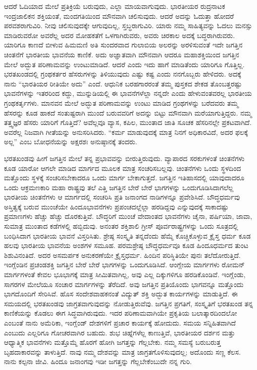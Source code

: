 ಆದರೆ ಓದಿಯಾದ ಮೇಲೆ ಪ್ರತಿಕ್ರಿಯೆ ಬರುವುದು, ಎಲ್ಲಾ ಮಾಯವಾಗುವುದು. ಭಾರತೀಯರ ರುದ್ರನಾಟಕ ಇಂದ್ರಜಾಲಿಕನ ಶಕ್ತಿಯಂತೆ, ಮಂದಗತಿಯಿಂದ ಮೌನ\break ವಾಗಿ ಚಲಿಸುವುದು. ಆದರೆ ಅದನ್ನು ಓದುತ್ತಾ ಹೋದರೆ ಪರವಶರಾಗುವಿರಿ. ನೀವು ಚಲಿಸುವುದಕ್ಕೇ ಆಗುವುದಿಲ್ಲ, ಸ್ತಬ್ಧರಾಗುವಿರಿ. ಯಾರು ನಮ್ಮ ಸಾಹಿತ್ಯವನ್ನು ಓದಲು ಮನಸ್ಸು ಮಾಡಿರುವರೋ ಅವರೆಲ್ಲ ಅದರ ಮೋಹಕತೆಗೆ ಒಳಗಾಗಿರುವರು, ಅವರು ಚಿರಕಾಲ ಅದಕ್ಕೆ ಬದ್ಧರಾಗಿರುವರು. ಯಾರಿಗೂ ಕಾಣದೆ ಬೀಳುವ ಹಿಮಮಣಿ ಅತಿ ಸುಂದರವಾದ ಗುಲಾಬಿಯ ಅಲರನ್ನು ಅರಳಿಸುವಂತೆ ಇದೇ ಜಗತ್ತಿನ ಚಿಂತನೆಗೆ ಭಾರತೀಯ ಭಾವನೆಯ ಕಾಣಿಕೆ. ಅದು ಅಜ್ಞಾತವಾಗಿ ಮೌನವಾಗಿ ಆದರೂ ಮಹಾಶಕ್ತಿಯಿಂದ ಜಗತ್ತಿನ ಮೇಲೆ ಅದ್ಭುತ ಪರಿಣಾಮವನ್ನು ಉಂಟುಮಾಡಿದೆ. ಆದರೆ ಎಂದು ಇದು ಹಾಗೆ ಮಾಡಿತೆಂದು ಯಾರಿಗೂ ಗೊತ್ತಿಲ್ಲ. ಭರತಖಂಡದಲ್ಲಿ ಗ್ರಂಥಕರ್ತರ ಹೆಸರುಗಳನ್ನು ತಿಳಿಯುವುದು ಎಷ್ಟು ಕಷ್ಟ ಎಂದು ನನಗೊಬ್ಬರು ಹೇಳಿದರು. ಅದಕ್ಕೆ ನಾನು “ಭಾರತಿಯರ ರೀತಿಯೇ ಅದು” ಎಂದೆ. ಆಧುನಿಕ ಬರಹಗಾರರಂತೆ ತಮ್ಮ ಪುಸ್ತಕದ ಶೇಕಡ ತೊಂಬತ್ತರಷ್ಟು ಭಾವನೆಗಳನ್ನು ಇತರರಿಂದ ಕದ್ದು, ಮುನ್ನುಡಿಯಲ್ಲಿ ಈ ಭಾವನೆಗಳೆಲ್ಲಾ ನನ್ನದೇ ಎಂದು ಹೇಳುವಂತವರಲ್ಲ ಭಾರತೀಯ ಗ್ರಂಥಕರ್ತೃಗಳು. ಮಾನವನ ಮೇಲೆ ಅದ್ಭುತ ಪರಿಣಾಮವನ್ನು ಉಂಟು ಮಾಡಿದ ಗ್ರಂಥಗಳನ್ನು ಬರೆದವರು ತಮ್ಮ ಹೆಸರನ್ನು ಕೂಡ ಹಾಕದೆ ಸಂತುಷ್ಟರಾಗಿ ಮುಂದೆ ಬರುವವರಿಗೆ ಅದನ್ನು ಬಿಟ್ಟು ಮೌನವಾಗಿ ಮರೆಯಾಗುತ್ತಿದ್ದರು. ನಮ್ಮ ತತ್ತ್ವಜ್ಞರ ಹೆಸರು ಯಾರಿಗೆ ಗೊತ್ತಿದೆ? ಅವೆಲ್ಲವೂ ವ್ಯಾಸ, ಕಪಿಲ, ಮುಂತಾದ ಜಾತಿ ಸೂಚಕ ಹೆಸರಿನಲ್ಲೇ ಪ್ರಕಟವಾಗಿದೆ. ಅವರೆಲ್ಲ ನಿಜವಾಗಿ ಗೀತೆಯನ್ನು ಅನುಸರಿಸಿದರು. “ಕರ್ಮ ಮಾಡುವುದಕ್ಕೆ ಮಾತ್ರ ನಿನಗೆ ಅಧಿಕಾರವಿದೆ, ಅದರ ಫಲಕ್ಕೆ ಅಲ್ಲ” ಎಂಬ ಬೋಧನೆಯನ್ನು ಅಕ್ಷರಶಃ ಅನುಷ್ಠಾನಕ್ಕೆ ತಂದರು.

\vskip   4pt

ಭರತಖಂಡವು ಹೀಗೆ ಜಗತ್ತಿನ ಮೇಲೆ ತನ್ನ ಪ್ರಭಾವವನ್ನು ಬೀರುತ್ತಿರುವುದು. ವ್ಯಾಪಾರದ ಸರಕುಗಳಂತೆ ಚಿಂತನೆಗಳು ಕೂಡ ಯಾರೋ ಆಗಲೇ ಮಾಡಿದ ಮಾರ್ಗದ ಮೂಲಕ ಮಾತ್ರ ಸಂಚರಿಸಬಲ್ಲವು. ಚಿಂತನೆಗಳು ಒಂದು ಸ್ಥಳದಿಂದ ಮತ್ತೊಂದು ಸ್ಥಳಕ್ಕೆ ಸಂಚರಿಸಬೇಕಾದರೂ ಒಂದು ಮಾರ್ಗ ಬೇಕಾಗುತ್ತದೆ. ಜಗತ್ತಿನ ಇತಿಹಾಸದಲ್ಲಿ ಯಾವು\-ದಾದರೂ ಒಂದು ಆಕ್ರಮಣಕಾರಿ ಮಹಾ ರಾಷ್ಟ್ರವು ತಲೆ ಎತ್ತಿ ಜಗತ್ತಿನ ಬೇರೆ ಬೇರೆ ಭಾಗಗಳನ್ನು ಒಂದುಗೂಡಿಸಿದಾಗಲೆಲ್ಲ ಭಾರತೀಯ ಚಿಂತನೆಗಳು ಆ ಮಾರ್ಗದಲ್ಲಿ ಸಂಚರಿಸಿ ಪ್ರತಿ ಜನಾಂಗದ ನಾಡಿಗಳನ್ನೂ ಪ್ರವೇಶಿಸಿದೆ. ಬೌದ್ಧಧರ್ಮವು ಅಸ್ತಿತ್ವಕ್ಕೆ ಬರುವ ಮುಂಚೆಯೇ ಹಿಂದೂಭಾವನೆಗಳು ಪ್ರಪಂಚದಲ್ಲೆಲ್ಲಾ ಹರಡಿದ್ದವು ಎನ್ನುವುದಕ್ಕೆ ಸಾಕಾದಷ್ಟು ಪ್ರಮಾಣಗಳು ಹೆಚ್ಚು ಹೆಚ್ಚು ದೊರಕುತ್ತಿವೆ. ಬೌದ್ಧರಿಗೆ ಮುಂಚೆ ವೇದಾಂತದ ಭಾವನೆಗಳು ಚೈನಾ, ಪರ್ಷಿಯಾ, ಜಾವಾ, ಸುಮಾತ್ರ ಮುಂತಾದ ಕಡೆಗಳಲ್ಲಿ ಹಬ್ಬಿದುವು. ಅನಂತರ ಶಕ್ತಿಶಾಲಿ ಗ್ರೀಸ್​ ಪೂರ್ವರಾಷ್ಟ್ರಗಳನ್ನು ಒಂದು ಸೂತ್ರದಲ್ಲಿ ಬಂಧಿಸಿದಾಗ ಭಾರತೀಯ ಭಾವನೆ ವಿಸ್ತರಿಸಿತು. ಶ್ರೇಷ್ಠ ಸಂಸ್ಕೃತಿ ತನ್ನದೆಂದು ಹೆಮ್ಮೆ ಕೊಚ್ಚಿಕೊಳ್ಳುವ ಕ್ರೈಸ್ತ ಧರ್ಮ ಕೂಡ ಹಲವು ಭಾರತೀಯ ಭಾವನೆಯ ಅಂಶಗಳ ಸಮೂಹ. ಪರಮಶ್ರೇಷ್ಠ ಬೌದ್ಧಧರ್ಮವೂ ಕೂಡ ಹಿಂದೂಧರ್ಮದ ತುಂಟ ಶಿಶುವಿನಂತಿದೆ. ಅದರ ಅಸಮರ್ಪಕ ಅನುಕರಣೆಯೇ ಕ್ರೈಸ್ತಧರ್ಮ. ಹಿಂದಿನ ಪರಿಸ್ಥಿತಿಯೇ ಪುನಃ ತಲೆದೋರುತ್ತಿದೆ. ಇಂಗ್ಲೆಂಡಿನ ಪ್ರಚಂಡಶಕ್ತಿ ಜಗತ್ತಿನ ಬೇರೆ ಬೇರೆ ಭಾಗಗಳನ್ನು ಒಂದುಗೂಡಿಸಿದೆ. ಆಂಗ್ಲೇಯ ಮಾರ್ಗಗಳು ರೋಮನ್​ ಮಾರ್ಗಗಳಂತೆ ಕೇವಲ ಭೂಭಾಗಕ್ಕೆ ಮಾತ್ರ ಸೀಮಿತವಾಗಿಲ್ಲ, ಅವು ಎಲ್ಲ ದಿಕ್ಕುಗಳಿಗೂ ಹರಡಿಕೊಂಡಿವೆ. ಇಂಗ್ಲೆಂಡು, ಸಾಗರಗಳ ಮೇಲೆಯೂ ಸಂಚಾರ ಮಾರ್ಗಗಳನ್ನು ತೆರೆದಿದೆ. ಅವು ಜಗತ್ತಿನ ಪ್ರತಿಯೊಂದು ಭಾಗವನ್ನೂ ಮತ್ತೊಂದು ಭಾಗದೊಂದಿಗೆ ಸೇರಿಸಿವೆ. ಹೊಸ ಸಂದೇಶವಾಹಕನಂತೆ ವಿದ್ಯುತ್​ ಶಕ್ತಿ ಅದ್ಭುತ ಕಾರ್ಯಗಳನ್ನು ಮಾಡುತ್ತಿದೆ. ಈ ಸಮಯದಲ್ಲಿ ಭರತಖಂಡವು ಜಾಗ್ರತವಾಗುವುದನ್ನು ನೋಡುತ್ತಿರುವೆವು. ಜಗತ್ತಿನ ಪ್ರಗತಿಗೆ, ಸಂಸ್ಕೃತಿಗೆ ಭರತಖಂಡ ತನ್ನ ಕಾಣಿಕೆಯನ್ನು ಕೊಡಲು ಈಗ ಸಿದ್ಧವಾಗಿರುವುದು. ಇದರ ಪರಿಣಾಮವಾಗಿಯೇ ಪ್ರಕೃತಿಯ ಬಲಾತ್ಕಾರದಿಂದಲೋ ಎಂಬಂತೆ ನಾನು ಅಮೆರಿಕಾ, ಇಂಗ್ಲೆಂಡ್​ ದೇಶಗಳಿಗೆ ಪ್ರಚಾರ ಕಾರ್ಯಕ್ಕೆ ಹೋದುದು. ಸಮಯ ಸನ್ನಿಹಿತ\-ವಾಗಿದೆ ಎಂಬುದು ಎಲ್ಲರಿಗೂ ಗೋಚರವಾಗಿರ ಬಹುದು. ಶುಭ ಚಿಹ್ನೆಗಳೆಲ್ಲ ಕಾಣುತ್ತಿವೆ, ಭಾರತೀಯರ ದರ್ಶನ ಮತ್ತು ಆಧ್ಯಾತ್ಮಿಕ ಭಾವನೆಗಳು ಮತ್ತೊಮ್ಮೆ ಹೊರಗೆ ಹೋಗಿ ಜಗತ್ತನ್ನು ಗೆಲ್ಲಬೇಕು. ನಮ್ಮ ಸಮಸ್ಯೆ ಬರುಬರುತ್ತ ಬೃಹದಾಕಾರವನ್ನು ತಾಳುತ್ತಿದೆ. ನಾವು ನಮ್ಮ ದೇಶವನ್ನು ಮಾತ್ರ ಜಾಗ್ರತಗೊಳಿಸುವುದಲ್ಲ; ಅದೊಂದು ಸಣ್ಣ ಕೆಲಸ. ನಾನು ಕಲ್ಪನಾ ಜೀವಿ. ಹಿಂದೂ ಜನಾಂಗವು ಇಡೀ ಜಗತ್ತನ್ನು ಗೆಲ್ಲಬೇಕೆಂಬುದೇ ನನ್ನ ಗುರಿ.

